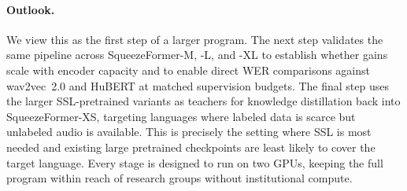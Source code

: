 \documentclass{article}
\begin{document}
\paragraph{Outlook.}
We view this as the first step of a larger program. The next step
validates the same pipeline across SqueezeFormer-M, -L, and -XL to
establish whether gains scale with encoder capacity and to enable
direct WER comparisons against wav2vec~2.0 and HuBERT at matched
supervision budgets. The final step uses the larger SSL-pretrained
variants as teachers for knowledge distillation back into
SqueezeFormer-XS, targeting languages where labeled data is scarce
but unlabeled audio is available. This is precisely the setting where
SSL is most needed and existing large pretrained checkpoints are
least likely to cover the target language. Every stage is designed
to run on two GPUs, keeping the full program within reach of
research groups without institutional compute.



\end{document}

